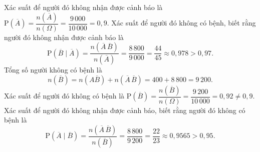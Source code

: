 \begin{ex}
{\begin{center}
		\end{center}
		\begin{itemchoice}
			\itemch Xác suất để người đó không nhận được cảnh báo là $\mathrm{P}\left(\overline{A}\right) = \dfrac{n\left(\overline{A}\right)}{n(\Omega)} = \dfrac{9\,000}{10\,000} = 0{,}9$.
			\itemch Xác suất để người đó không có bệnh, biết rằng người đó không nhận được cảnh báo là \[\mathrm{P}\left(\overline{B} \mid \overline{A}\right) = \dfrac{n\left(\overline{A}\, \overline{B}\right)}{n\left(\overline{A}\right)} = \dfrac{8\,800}{9\,000} = \dfrac{44}{45} \approx 0{,}978 > 0{,}97.\]
			\itemch Tổng số người không có bệnh là \[n\left(\overline{B}\right) = n\left(A \overline{B}\right) + n\left(\overline{A}\, \overline{B}\right) = 400 + 8\,800 = 9\,200.\]
			Xác suất để người đó không có bệnh là $\mathrm{P}\left(\overline{B}\right) = \dfrac{n\left(\overline{B}\right)}{n(\Omega)} = \dfrac{9\,200}{10\,000} = 0{,}92 \neq 0{,}9$.
			\itemch Xác suất để người đó không nhận được cảnh báo, biết rằng người đó không có bệnh là \[\mathrm{P}\left(\overline{A} \mid \overline{B}\right) = \dfrac{n\left(\overline{A}\, \overline{B}\right)}{n\left(\overline{B}\right)} = \dfrac{8\,800}{9\,200} = \dfrac{22}{23} \approx 0{,}9565 > 0{,}95.\]
		\end{itemchoice}
	}
\end{ex}

